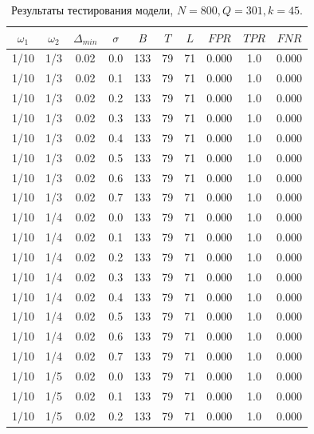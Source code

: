 \documentclass[specialist, substylefile = spbu.rtx,
			   subf, href, 12pt]{disser}
\begin{document}
\begin{table}[!hhh]
	\center
	\caption{Результаты тестирования модели, $ N = 800, Q=301, k=45 $.}
	\begin{tabular}{cccccccccc}
		\toprule
		$ \omega_1 $ & $ \omega_2 $ & $ \Delta_{min} $ & $ \sigma $ &    $ B $ &   $ T $ &   $ L $ &    $ FPR $ &    $ TPR $ &    $ FNR $ \\
		\midrule
		1/10 &   1/3 &     0.02 &     0.0 & 133 & 79 & 71 & 0.000 & 1.0 & 0.000 \\
		1/10 &   1/3 &     0.02 &     0.1 & 133 & 79 & 71 & 0.000 & 1.0 & 0.000 \\
		1/10 &   1/3 &     0.02 &     0.2 & 133 & 79 & 71 & 0.000 & 1.0 & 0.000 \\
		1/10 &   1/3 &     0.02 &     0.3 & 133 & 79 & 71 & 0.000 & 1.0 & 0.000 \\
		1/10 &   1/3 &     0.02 &     0.4 & 133 & 79 & 71 & 0.000 & 1.0 & 0.000 \\
		1/10 &   1/3 &     0.02 &     0.5 & 133 & 79 & 71 & 0.000 & 1.0 & 0.000 \\
		1/10 &   1/3 &     0.02 &     0.6 & 133 & 79 & 71 & 0.000 & 1.0 & 0.000 \\
		1/10 &   1/3 &     0.02 &     0.7 & 133 & 79 & 71 & 0.000 & 1.0 & 0.000 \\
		\hline
		1/10 &   1/4 &     0.02 &     0.0 & 133 & 79 & 71 & 0.000 & 1.0 & 0.000 \\
		1/10 &   1/4 &     0.02 &     0.1 & 133 & 79 & 71 & 0.000 & 1.0 & 0.000 \\
		1/10 &   1/4 &     0.02 &     0.2 & 133 & 79 & 71 & 0.000 & 1.0 & 0.000 \\
		1/10 &   1/4 &     0.02 &     0.3 & 133 & 79 & 71 & 0.000 & 1.0 & 0.000 \\
		1/10 &   1/4 &     0.02 &     0.4 & 133 & 79 & 71 & 0.000 & 1.0 & 0.000 \\
		1/10 &   1/4 &     0.02 &     0.5 & 133 & 79 & 71 & 0.000 & 1.0 & 0.000 \\
		1/10 &   1/4 &     0.02 &     0.6 & 133 & 79 & 71 & 0.000 & 1.0 & 0.000 \\
		1/10 &   1/4 &     0.02 &     0.7 & 133 & 79 & 71 & 0.000 & 1.0 & 0.000 \\
		\hline
		1/10 &   1/5 &     0.02 &     0.0 & 133 & 79 & 71 & 0.000 & 1.0 & 0.000 \\
		1/10 &   1/5 &     0.02 &     0.1 & 133 & 79 & 71 & 0.000 & 1.0 & 0.000 \\
		1/10 &   1/5 &     0.02 &     0.2 & 133 & 79 & 71 & 0.000 & 1.0 & 0.000 \\

\end{tabular}
\end{table}
\end{document}
